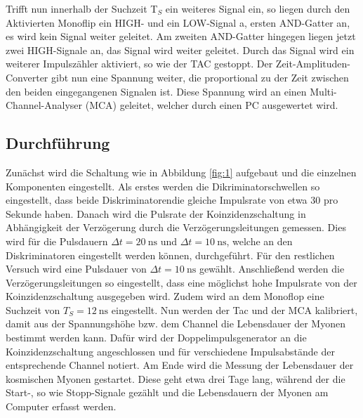 Trifft nun innerhalb der Suchzeit T$_S$ ein weiteres Signal ein, so liegen durch den Aktivierten Monoflip ein HIGH- und ein LOW-Signal a, ersten AND-Gatter an, es wird kein Signal weiter geleitet.
Am zweiten AND-Gatter hingegen liegen jetzt zwei HIGH-Signale an, das Signal wird weiter geleitet.
Durch das Signal wird ein weiterer Impulszähler aktiviert, so wie der TAC gestoppt.
Der Zeit-Amplituden-Converter gibt nun eine Spannung weiter, die proportional zu der Zeit zwischen den beiden eingegangenen Signalen ist.
Diese Spannung wird an einen Multi-Channel-Analyser (MCA) geleitet, welcher durch einen PC ausgewertet wird.

\subsection{Durchführung}
Zunächst wird die Schaltung wie in Abbildung \ref{fig:1} aufgebaut und die einzelnen Komponenten eingestellt.
Als erstes werden die Dikriminatorschwellen so eingestellt, dass beide Diskriminatorendie gleiche Impulsrate von etwa 30 pro Sekunde haben.
Danach wird die Pulsrate der Koinzidenzschaltung in Abhängigkeit der Verzögerung durch die Verzögerungsleitungen gemessen.
Dies wird für die Pulsdauern $\Delta t = \SI{20}{\nano\second}$ und $\Delta t = \SI{10}{\nano\second}$, welche an den Diskriminatoren eingestellt werden können, durchgeführt.
Für den restlichen Versuch wird eine Pulsdauer von $\Delta t = \SI{10}{\nano\second}$ gewählt.
Anschließend werden die Verzögerungsleitungen so eingestellt, dass eine möglichst hohe Impulsrate von der Koinzidenzschaltung ausgegeben wird.
Zudem wird an dem Monoflop eine Suchzeit von $T_S = \SI{12}{\nano\second}$ eingestellt.
Nun werden der Tac und der MCA kalibriert, damit aus der Spannungshöhe bzw. dem Channel die Lebensdauer der Myonen bestimmt werden kann.
Dafür wird der Doppelimpulsgenerator an die Koinzidenzschaltung angeschlossen und für verschiedene Impulsabstände der entsprechende Channel notiert.
Am Ende wird die Messung der Lebensdauer der kosmischen Myonen gestartet.
Diese geht etwa drei Tage lang, während der die Start-, so wie Stopp-Signale gezählt und die Lebensdauern der Myonen am Computer erfasst werden.